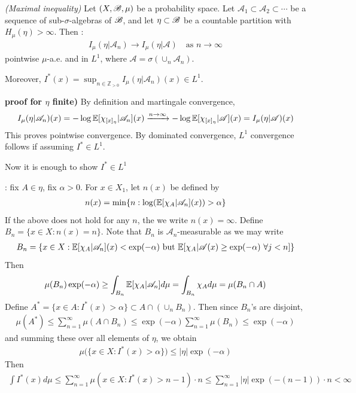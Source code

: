 \documentclass[12pt,a4paper]{report}
\newenvironment{proof}
{\begin{changemargin}{1cm}{0.5cm} 
	}%
	{\end{changemargin}
}
\newenvironment{subproof}
{\begin{changemargin}{0.5cm}{0.5cm}
	}%
	{\end{changemargin}
}
\begin{document}
\thm \emph{(Maximal inequality)} Let $(X,\mathscr{B}, \mu)$ be a probability space. Let $\mathscr{A}_1 \subset \mathscr{A}_2 \subset \cdots$ be a sequence of sub-$\sigma$-algebras of $\mathscr{B}$, and let $\eta \subset \mathscr{B}$ be a countable partition with $H_{\mu}(\eta) >\infty$. Then :
\begin{align*}
I_{\mu}(\eta | \mathscr{A}_n) \rightarrow I_{\mu}(\eta | \mathscr{A}) \quad \text{as } n\rightarrow \infty
\end{align*}
pointwise $\mu$-a.e. and in $L^1$, where $\mathscr{A} = \sigma(\cup_n \mathscr{A}_n)$.

\quad Moreover, $I^*(x) = \sup_{n\in \mathbb{Z}_{>0}}I_{\mu}(\eta | \mathscr{A}_n) (x) \in L^1$.
\begin{proof}
\textbf{proof for $\eta$ finite)} By definition and martingale convergence,
\begin{align*}
I_{\mu}(\eta | \mathscr{A}_n)(x) = -\log \mathbb{E} [ \chi_{[x]_{\eta}} | \mathscr{A}_n ](x) \xrightarrow{n\rightarrow \infty} -\log \mathbb{E} [ \chi_{[x]_{\eta}} | \mathscr{A}](x) = I_{\mu}(\eta | \mathscr{A})(x)
\end{align*}
This proves pointwise convergence. By dominated convergence, $L^1$ convergence follows if assuming $I^* \in L^1$.

\quad Now it is enough to show $I^* \in L^1$
\begin{subproof}
: fix $A \in \eta$, fix $\alpha>0$. For $x\in X_1$, let $n(x)$ be defined by
\begin{align*}
n(x) = \min \{ n : \log (\mathbb{E}[\chi_A | \mathscr{A}_n](x)) > \alpha \}
\end{align*}
If the above does not hold for any $n$, the we write $n(x) = \infty$. Define $B_n = \{ x\in X : n(x) =n \}$. Note that $B_n$ is $\mathscr{A}_n$-measurable as we may write
\begin{align*}
B_n = \{ x\in X : \mathbb{E}[\chi_A | \mathscr{A}_n](x) < \exp(-\alpha) \text{ but } \mathbb{E}[\chi_A |\mathscr{A}(x) \geq \exp(-\alpha) \,\, \forall j<n ] \}
\end{align*}
Then
\begin{align*}
\mu(B_n) \exp(-\alpha) \geq \int_{B_n} \mathbb{E}[\chi_A | \mathscr{A}_n] d\mu = \int_{B_n} \chi_A d\mu = \mu(B_n \cap A)
\end{align*}
Define $A^* = \{ x\in A : I^*(x) > \alpha \} \subset A \cap (\cup_n B_n)$. Then since $B_n$'s are disjoint,
\begin{align*}
\mu(A^*) \leq \sum_{n=1}^{\infty} \mu(A\cap B_n) \leq \exp(-\alpha) \sum_{n=1}^{\infty} \mu(B_n) \leq \exp(-\alpha)
\end{align*}
and summing these over all elements of $\eta$, we obtain
\begin{align*}
\mu \big( \{ x\in X : I^*(x) > \alpha \} \big) \leq |\eta| \exp(-\alpha)
\end{align*}
Then
\begin{align*}
\int I^*(x) d\mu \leq \sum_{n=1}^{\infty} \mu(x\in X : I^*(x) > n-1) \cdot n \leq \sum_{n=1}^{\infty} |\eta| \exp(-(n-1))\cdot n < \infty
\end{align*}
\end{subproof}

\eop
\end{proof}
\s
\end{document}
